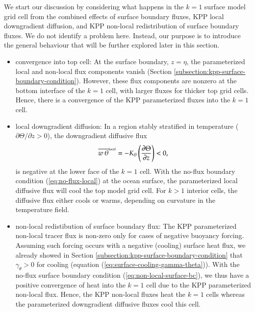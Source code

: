 We start our discussion by considering what happens in the $k=1$
surface model grid cell from the combined effects of surface boundary
fluxes, KPP local downgradient diffusion, and KPP non-local
redistribution of surface boundary fluxes.  We do not identify a
problem here.  Instead, our purpose is to introduce the general
behaviour that will be further explored later in this section. 
\begin{itemize}

\item {\sc convergence into top cell}: At the surface boundary,
  $z=\eta$, the parameterized local and non-local flux components
  vanish (Section \ref{subsection:kpp-surface-boundary-condition}).
  However, these flux components are nonzero at the bottom interface
  of the $k=1$ cell, with larger fluxes for thicker top grid cells.
  Hence, there is a convergence of the KPP parameterized fluxes into
  the $k=1$ cell.

\item {\sc local downgradient diffusion}: In a region stably
  stratified in temperature ($\partial \Theta / \partial z > 0$), the
  downgradient diffusive flux
\begin{equation}
\overline{w \, \theta}^{\mbox{\tiny local}} = -K_{\theta} \left( \frac{\partial \Theta}{\partial z} \right) < 0,
\end{equation}
is negative at the lower face of the $k=1$ cell.  With the no-flux
boundary condition (\ref{eq:no-flux-local}) at the ocean surface, the
parameterized local diffusive flux will cool the top model grid
cell. For $k > 1$ interior cells, the diffusive flux either cools or
warms, depending on curvature in the temperature field.

\item {\sc non-local redistibution of surface boundary flux}: The KPP
  parameterized non-local tracer flux is non-zero only for cases of
  negative buoyancy forcing.  Assuming such forcing occurs with a
  negative (cooling) surface heat flux, we already showed in Section
  \ref{subsection:kpp-surface-boundary-condition} that
  $\gamma_{\theta} > 0$ for cooling (equation
  (\ref{eq:surface-cooling-gamma-theta})).  With the no-flux surface
  boundary condition (\ref{eq:non-local-surface-bc}), we thus have a
  positive convergence of heat into the $k=1$ cell due to the KPP
  parameterized non-local flux.  Hence, the KPP non-local fluxes heat
  the $k=1$ cells whereas the parameterized downgradient diffusive
  fluxes cool this cell.

\end{itemize}

